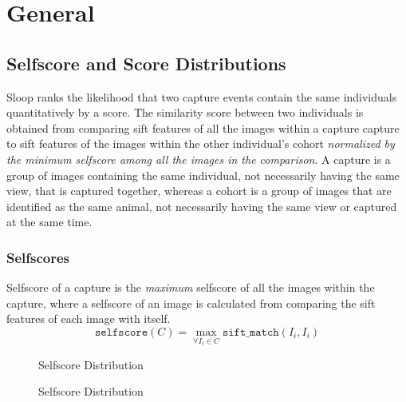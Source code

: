 \section{General}

\subsection{Selfscore and Score Distributions}

Sloop ranks the likelihood that two capture events contain the same individuals
quantitatively by a score. The similarity score between two individuals is
obtained from comparing sift features of all the images within a capture
capture to sift features of the images within the other individual's cohort
\emph{normalized by the minimum selfscore among all the images in the
comparison}. A capture is a group of images containing the same individual, not
necessarily having the same view, that is captured together, whereas a cohort
is a group of images that are identified as the same animal, not necessarily
having the same view or captured at the same time.

\subsubsection{Selfscores}

Selfscore of a capture is the \emph{maximum} selfscore of all the images within
the capture, where a selfscore of an image is calculated from comparing the
sift features of each image with itself.  $$\texttt{selfscore}(C) =
\max_{\forall I_i \in C} \texttt{sift\_match}(I_i, I_i)$$ 

\begin{figure}[htb]
  \centering
  \qquad
  \captionsetup{justification=centering}
  \caption{Selfscore Distribution}
\end{figure}

\begin{figure}[htb]
  \centering
  \qquad
  \captionsetup{justification=centering}
  \caption{Selfscore Distribution}
\end{figure}
\FloatBarrier%

